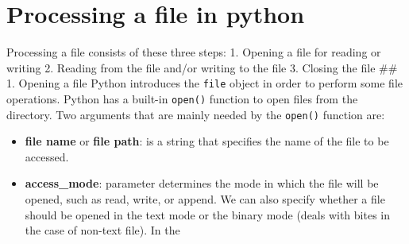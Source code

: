 \documentclass[11pt]{article}
\providecommand{\tightlist}{%
      \setlength{\itemsep}{0pt}\setlength{\parskip}{0pt}}
\begin{document}
\hypertarget{processing-a-file-in-python}{%
\section{Processing a file in
python}\label{processing-a-file-in-python}}

Processing a ﬁle consists of these three steps: 1. Opening a ﬁle for
reading or writing 2. Reading from the ﬁle and/or writing to the ﬁle 3.
Closing the ﬁle \#\# 1. Opening a file Python introduces the
\texttt{file} object in order to perform some file operations. Python
has a built-in \texttt{open()} function to open files from the
directory. Two arguments that are mainly needed by the \texttt{open()}
function are:

\begin{itemize}
\tightlist
\item
  \textbf{file name} or \textbf{file path}: is a string that specifies
  the name of the file to be accessed.
\item
  \textbf{access\_mode}: parameter determines the mode in which the file
  will be opened, such as read, write, or append. We can also specify
  whether a file should be opened in the text mode or the binary mode
  (deals with bites in the case of non-text file). In the
\end{itemize}
\end{document}
